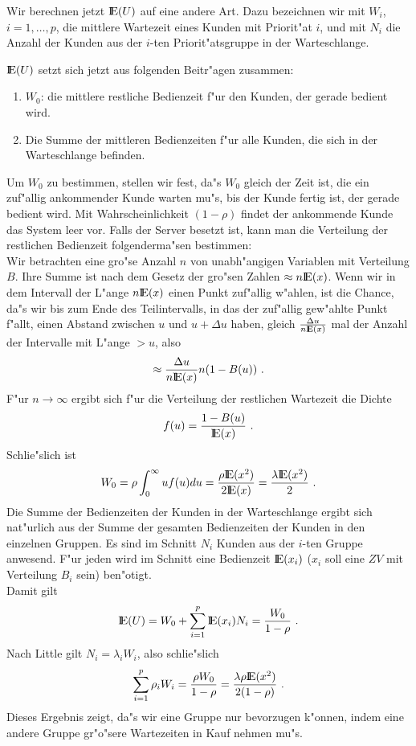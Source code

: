 Wir berechnen jetzt ${\rm I\kern-0.2em E}(U)$ auf eine andere Art. Dazu bezeichnen wir mit $W_{i}$, $i=1, \dots , p$, die mittlere Wartezeit eines Kunden mit Priorit"at $i$, und
mit
$N_{i}$ die Anzahl der Kunden aus der $i$-ten Priorit"atsgruppe in der Warteschlange.

${\rm I\kern-0.2em E}(U)$ setzt sich jetzt aus folgenden Beitr"agen zusammen:
\begin{enumerate}
\item $W_{0}$: die mittlere restliche Bedienzeit f"ur den Kunden, der gerade bedient wird.
\item Die Summe der mittleren Bedienzeiten f"ur alle Kunden, die sich in der Warteschlange befinden.
\end{enumerate}
Um $W_{0}$ zu bestimmen, stellen wir fest, da"s $W_{0}$ gleich der Zeit ist, die ein zuf"allig ankommender Kunde warten mu"s, bis der Kunde fertig ist, der gerade
bedient wird. Mit Wahrscheinlichkeit $(1-\rho)$ findet der ankommende Kunde das System leer vor. Falls der Server besetzt ist, kann man die Verteilung der
restlichen Bedienzeit folgenderma"sen bestimmen: \\
Wir betrachten eine gro"se Anzahl $n$ von unabh"angigen Variablen mit Verteilung $B$. Ihre Summe ist nach dem Gesetz der gro"sen Zahlen $\approx n{\rm I\kern-0.2em E}(x)$. Wenn wir
in dem Intervall der L"ange $n{\rm I\kern-0.2em E}(x)$ einen Punkt zuf"allig w"ahlen, ist die Chance, da"s wir bis zum Ende des Teilintervalls, in das der zuf"allig gew"ahlte Punkt
f"allt, einen Abstand zwischen $u$ und $u+\Delta u$ haben, gleich $\frac{\Delta u}{n{\rm I\kern-0.2em E}(x)}$ mal der Anzahl der Intervalle mit L"ange $> u$, also
\[  \approx \frac{\Delta u}{n{\rm I\kern-0.2em E}(x)}n(1-B(u)) ~.  \] 
 F"ur $n \rightarrow \infty$ ergibt sich f"ur die Verteilung der restlichen Wartezeit die Dichte
\[f(u)=\frac{1-B(u)}{{\rm I\kern-0.2em E}(x)} ~. \]
Schlie"slich ist
\[W_{0}=\rho \int_{0}^{\infty}uf(u)du = \frac{\rho {\rm I\kern-0.2em E}(x^{2})}{2{\rm I\kern-0.2em E}(x)}=\frac{\lambda {\rm I\kern-0.2em E}(x^{2})}{2} ~. \]
Die Summe der Bedienzeiten der Kunden in der Warteschlange ergibt sich nat"urlich aus der Summe der gesamten Bedienzeiten der Kunden in den einzelnen Gruppen.
Es sind im Schnitt $N_{i}$ Kunden aus der $i$-ten Gruppe anwesend. F"ur jeden wird im Schnitt eine Bedienzeit ${\rm I\kern-0.2em E}(x_{i})$ ($x_{i}$ soll eine $ZV$ mit Verteilung
$B_{i}$ sein) ben"otigt. \\
Damit gilt
\[{\rm I\kern-0.2em E}(U)=W_{0}+\sum_{i=1}^{p}{\rm I\kern-0.2em E}(x_{i})N_{i}=\frac{W_{0}}{1-\rho} ~. \]
Nach Little gilt $N_{i}=\lambda_{i}W_{i}$, also schlie"slich
\[ \sum_{i=1}^{p}\rho_{i}W_{i}=\frac{\rho W_{0}}{1-\rho}=\frac{\lambda \rho {\rm I\kern-0.2em E}(x^{2})}{2(1-\rho)} ~.\]
Dieses Ergebnis zeigt, da"s wir eine Gruppe nur bevorzugen k"onnen, indem eine andere Gruppe gr"o"sere Wartezeiten in Kauf nehmen mu"s.

